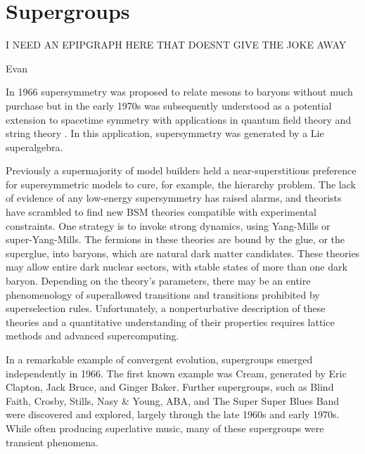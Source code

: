 \section{Supergroups}

\epigraph{I NEED AN EPIPGRAPH HERE THAT DOESNT GIVE THE JOKE AWAY}{Evan}


In 1966 supersymmetry was proposed to relate mesons to baryons\cite{doi:10.1143/PTP.36.1266} without much purchase but in the early 1970s was subsequently understood as a potential extension to spacetime symmetry with applications in quantum field theory and string theory \cite{Gervais:1971ji,Ramond:1971gb,Volkov:1973ix,Wess:1974tw}.
In this application, supersymmetry was generated by a Lie superalgebra.

Previously a supermajority of model builders held a near-superstitious preference for supersymmetric models to cure, for example, the hierarchy problem.
The lack of evidence of any low-energy supersymmetry has raised alarms, and theorists have scrambled to find new BSM theories compatible with experimental constraints.
One strategy is to invoke strong dynamics, using Yang-Mills or super-Yang-Mills.
The fermions in these theories are bound by the glue, or the superglue, into baryons, which are natural dark matter candidates.
These theories may allow entire dark nuclear sectors, with stable states of more than one dark baryon.
Depending on the theory's parameters, there may be an entire phenomenology of superallowed transitions and transitions prohibited by superselection rules.
Unfortunately, a nonperturbative description of these theories and a quantitative understanding of their properties requires lattice methods and advanced supercomputing.

In a remarkable example of convergent evolution, supergroups emerged independently in 1966.
The first known example was Cream, generated by Eric Clapton, Jack Bruce, and Ginger Baker\cite{supergroups}.
Further supergroups, such as Blind Faith, Crosby, Stills, Nasy \& Young, ABA, and The Super Super Blues Band\cite{supersuperblues} were discovered and explored, largely through the late 1960s and early 1970s.
While often producing superlative music, many of these supergroups were transient phenomena.
